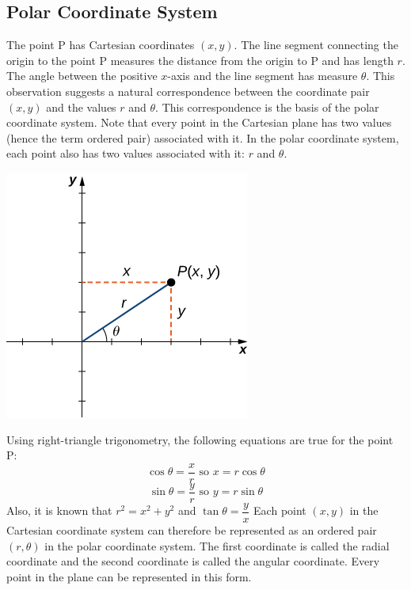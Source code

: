 \documentclass[12pt,addpoints]{exam}
\begin{document}
	\subsection*{Polar Coordinate System}
	The point  P has Cartesian coordinates $(x,y)$. The line segment connecting the origin to the point  P measures the distance from the origin to  P and has length $r$. The angle between the positive $x$-axis and the line segment has measure $\theta$. This observation suggests a natural correspondence between the coordinate pair $(x,y)$ and the values $r$ and $\theta$. This correspondence is the basis of the polar coordinate system. Note that every point in the Cartesian plane has two values (hence the term ordered pair) associated with it. In the polar coordinate system, each point also has two values associated with it:  $r$
	and $\theta$.
	\begin{center}
		\includegraphics[scale=1.20]{polar.jpeg}
	\end{center}
	Using right-triangle trigonometry, the following equations are true for the point  P:
	$$\cos \theta =\dfrac{x}{r}\text{ so }x=r\cos \theta $$
	$$\sin \theta =\dfrac{y}{r}\text{ so }y=r\sin \theta$$ 
	Also, it is known that $r^2=x^2+y^2$ and $\tan\theta=\dfrac{y}{x}$
	Each point $(x,y)$ in the Cartesian coordinate system can therefore be represented as an ordered pair $(r,\theta)$ in the polar coordinate system. The first coordinate is called the radial coordinate and the second coordinate is called the angular coordinate. Every point in the plane can be represented in this form.
\end{document}
